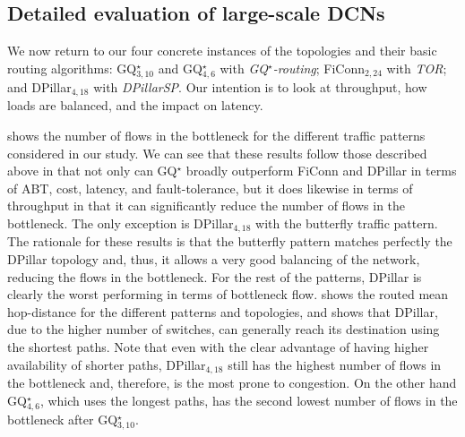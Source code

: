 \documentclass[]{amsart}
\newcommand{\tor}{\textit{TOR}}
\newcommand{\knkthreecol}{blue!70!black}
\begin{document}
{\subsection{Detailed evaluation of large-scale DCNs}
\label{sec:four-dcns}

We now return to our four concrete instances of the topologies and
their basic routing algorithms: GQ$^\star_{3,10}$ and GQ$^\star_{4,6}$ with
\emph{GQ$^\star$-routing\/}; FiConn$_{2,24}$ with \tor; and DPillar$_{4,18}$ with
\emph{DPillarSP\/}. Our intention is to look at throughput, how loads are balanced, and the impact on latency.

 shows the number of flows in the 
bottleneck for the different traffic
patterns considered in our study.  We can see that these results follow those described above in that not only can GQ$^\star$ broadly outperform FiConn and DPillar in terms of ABT, cost, latency, and fault-tolerance, but it does likewise in terms of throughput in that it can significantly reduce the
number of flows in the bottleneck.
The only exception is DPillar$_{4,18}$
with the butterfly traffic pattern.  The rationale for these results is that
the butterfly pattern matches perfectly the DPillar topology and,
thus, it allows a very good balancing of the network, reducing the
flows in the bottleneck.  For the rest of the patterns, DPillar is
clearly the worst performing in terms of bottleneck flow.
 shows the routed mean hop-distance for the
different patterns and topologies, and shows that DPillar, due to the
higher number of switches, can generally reach its destination using
the shortest paths.  Note that even with the clear advantage of having higher
availability of shorter paths, DPillar$_{4,18}$ still has the highest
number of flows in the bottleneck and, therefore, is the most prone to
congestion.  On the other hand GQ$^\star_{4,6}$, which uses the longest
paths, has the second lowest number of flows in the bottleneck after
GQ$^\star_{3,10}$.



\begin{figure}[ht]
  \centering


\end{figure}}
\end{document}
